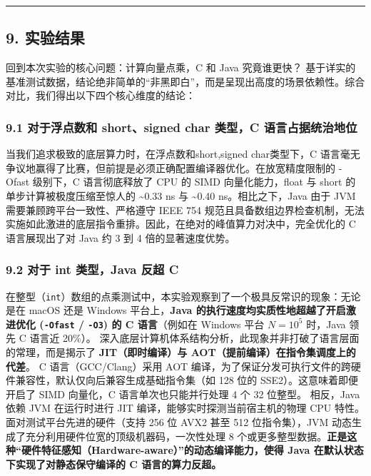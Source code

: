 \documentclass[12pt,fontset=none]{ctexart}
\begin{document}
\begin{center}\rule{0.5\linewidth}{0.5pt}\end{center}

\subsection{9. 实验结果}\label{9-ux5b9eux9a8cux7ed3ux679c}

回到本次实验的核心问题：计算向量点乘，C 和 Java 究竟谁更快？
基于详实的基准测试数据，结论绝非简单的``非黑即白''，而是呈现出高度的场景依赖性。综合对比，我们得出以下四个核心维度的结论：

\subsubsection{9.1 对于浮点数和 short、signed char 类型，C
语言占据统治地位}\label{91-ux5bf9ux4e8eux6d6eux70b9ux6570ux548c-shortsigned-char-ux7c7bux578bc-ux8bedux8a00ux5360ux636eux7edfux6cbbux5730ux4f4d}

当我们追求极致的底层算力时，在浮点数和short,signed char类型下，C
语言毫无争议地赢得了比赛，但前提是必须正确配置编译器优化。在放宽精度限制的
-Ofast 级别下，C 语言彻底释放了 CPU 的 SIMD 向量化能力，float 与 short
的单步计算被极度压缩至惊人的 \textasciitilde0.33 ns 与
\textasciitilde0.40 ns。相比之下，Java 由于 JVM
需要兼顾跨平台一致性、严格遵守 IEEE 754
规范且具备数组边界检查机制，无法实施如此激进的底层指令重排。因此，在绝对的峰值算力对决中，完全优化的
C 语言展现出了对 Java 约 3 到 4 倍的显著速度优势。

\subsubsection{9.2 对于 int 类型，Java 反超
C}\label{92-ux5bf9ux4e8e-int-ux7c7bux578bjava-ux53cdux8d85-c}

在整型（\texttt{int}）数组的点乘测试中，本实验观察到了一个极具反常识的现象：无论是在
macOS 还是 Windows 平台上，\textbf{Java
的执行速度均实质性地超越了开启激进优化 (\texttt{-Ofast} / \texttt{-O3})
的 C 语言}（例如在 Windows 平台 \(N=10^5\) 时，Java 领先 C 语言近
20\%）。
深入底层计算机体系结构分析，此现象并非打破了语言层面的常理，而是揭示了
\textbf{JIT（即时编译）与 AOT（提前编译）在指令集调度上的代差}。 C
语言（GCC/Clang）采用 AOT
编译，为了保证分发可执行文件的跨硬件兼容性，默认仅向后兼容生成基础指令集（如
128 位的 SSE2）。这意味着即便开启了 SIMD 向量化，C
语言单次也只能并行处理 4 个 32 位整型。 相反，Java 依赖 JVM 在运行时进行
JIT 编译，能够实时探测当前宿主机的物理 CPU
特性。面对测试平台先进的硬件（支持 256 位 AVX2 甚至 512 位指令集），JVM
动态生成了充分利用硬件位宽的顶级机器码，一次性处理 8
个或更多整型数据。\textbf{正是这种``硬件特征感知（Hardware-aware）''的动态编译能力，使得
Java 在默认状态下实现了对静态保守编译的 C 语言的算力反超。}
\end{document}
